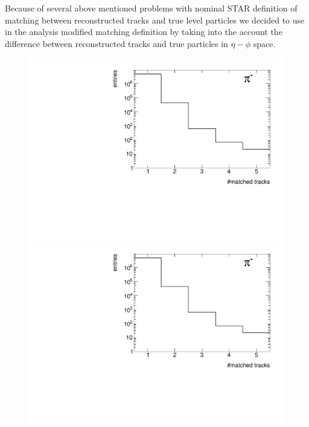Because of several above mentioned  problems with  nominal STAR definition of matching between reconstructed tracks and true  level particles we decided to use in the analysis modified matching            
definition by taking into the account the difference    between reconstructed tracks and true particles in $\eta-\phi$ space.




\begin{figure}[hb]
	\centering
	\parbox{0.329\textwidth}{
		\centering
		\includegraphics[width=\linewidth,page=25]{graphics/eff/trackSplitting_CD.pdf}\\
		\includegraphics[width=\linewidth,page=28]{graphics/eff/trackSplitting_CD.pdf}\\
	}~
	\parbox{0.329\textwidth}{
		\centering
}
\end{figure}
